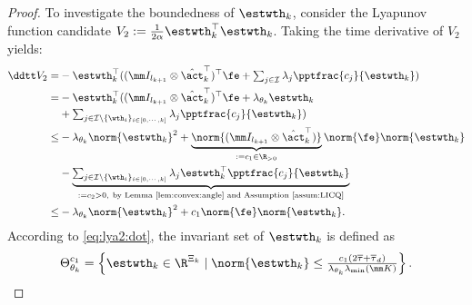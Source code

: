 \documentclass[final,5p,times,twocolumn,authoryear]{elsarticle}
\begin{document}
\begin{proof}
To investigate the boundedness of $\estwth_k$, consider the Lyapunov function candidate $V_2:=\tfrac{1}{2\alpha}\estwth_k^\top \estwth_k$.
Taking the time derivative of $V_2$ yields:
\begin{equation}
    \begin{aligned}
        \ddtt  V_2 
        =& 
        -\estwth_k^\top 
        (
            (\mm I_{l_{k+1}}\otimes \hat\act_k^\top)^\top
            \fe
            +
            \textstyle\sum_{j\in\mathcal{I}}
            \lambda_j 
            \pptfrac{c_j}{\estwth_k}
        )
        \\
        =&
        -\estwth_k^\top 
        (
            (\mm I_{l_{k+1}}\otimes \hat\act_k^\top)^\top
            \fe
            +
            \lambda_{\theta_k}\estwth_k
        \\
        &
            +
            \textstyle\sum_{
                j\in\mathcal{I}\setminus \{\wth_i\}_{i\in[0,\cdots,k]}
            }
            \lambda_j 
            \pptfrac{c_j}{\estwth_k}
        )
        \\
        \le&
        -
        \lambda_{\theta_k}\norm{\estwth_k}^2
        +
        \underbrace{
            \norm{(\mm I_{l_{k+1}}\otimes \hat\act_k^\top)}
        }_{:=c_1\in\R_{>0}}
        \norm{\fe}
        \norm{\estwth_k}
        \\
        &
        -
        \underbrace{
        \textstyle\sum_{
            j\in\mathcal{I}\setminus \{\wth_i\}_{i\in[0,\cdots,k]}
        }
        \lambda_j 
        \estwth_k^\top \pptfrac{c_j}{\estwth_k}
        }_{:= c_2 >0,\ \text{by Lemma \ref{lem:convex:angle} and Assumption \ref{assum:LICQ}}}
        \\
        \le&
        -
        \lambda_{\theta_k}\norm{\estwth_k}^2
        +
        c_1     
        \norm{\fe}
        \norm{\estwth_k}
        .
    \end{aligned}
    \label{eq:lya2:dot}
\end{equation}
According to \eqref{eq:lya2:dot}, the invariant set of $\estwth_k$ is defined as
\begin{equation}
    \Theta_{\theta_k}^{c_1} 
    = 
    \left\{ 
        \estwth_k \in \R^{\Xi_{k}} 
        \mid 
        \norm{\estwth_k} 
        \le 
        \tfrac{
            c_1(2\overline\tau+\overline\tau_d)
        }{
            \lambda_{\theta_k}\lambda_{\min}(\mm K)
        }
    \right\}
    .
    \label{eq:invariant:c1:wth}
\end{equation}


\end{proof}
\end{document}
